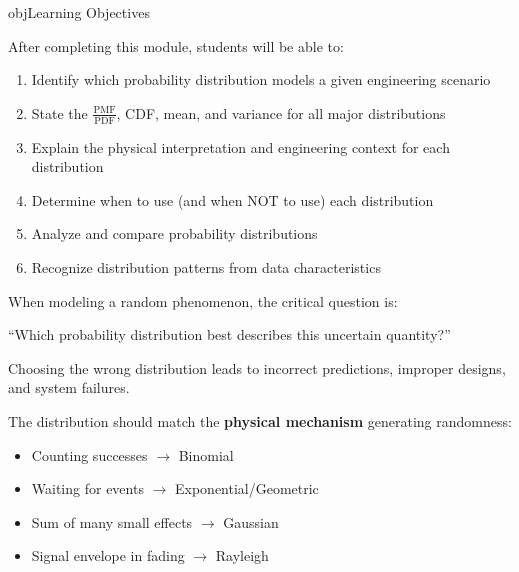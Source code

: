 \begin{PSbox}[unbreakable]{obj}{Learning Objectives}

After completing this module, students will be able to:

\begin{enumerate}
\def\labelenumi{\arabic{enumi}.}
\tightlist
\item
  Identify which probability distribution models a given engineering scenario
\item
  State the $\frac{\mathrm{PMF}}{\mathrm{PDF}}$, CDF, mean, and variance for all major distributions
\item
  Explain the physical interpretation and engineering context for each distribution
\item
  Determine when to use (and when NOT to use) each distribution
\item
  Analyze and compare probability distributions
\item
  Recognize distribution patterns from data characteristics
\end{enumerate}

\end{PSbox}



When modeling a random phenomenon, the critical question is:

\begin{PSquote}

``Which probability distribution best describes this uncertain quantity?''

\end{PSquote}

Choosing the wrong distribution leads to incorrect predictions, improper designs, and system failures.


The distribution should match the \textbf{physical mechanism} generating randomness:

\begin{itemize}
\tightlist
\item
  Counting successes \ensuremath{\to} Binomial
\item
  Waiting for events \ensuremath{\to} Exponential/Geometric
\item
  Sum of many small effects \ensuremath{\to} Gaussian
\item
  Signal envelope in fading \ensuremath{\to} Rayleigh
\end{itemize}


